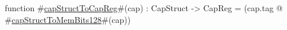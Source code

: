 function #\hyperref[zcapStructToCapReg]{capStructToCapReg}#(cap) : CapStruct -> CapReg =
    (cap.tag @ #\hyperref[zcapStructToMemBitsonetwoeight]{capStructToMemBits128}#(cap))
